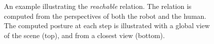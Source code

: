 \documentclass[preprint,5p]{elsarticle}
\begin{document}
\begin{figure}[!t]
	\centering
	\caption{An example illustrating the \textit{reachable} relation. The relation is computed from the perspectives of both the robot and the human. The computed posture at each step is illustrated with a global view of the scene (top), and from a closest view (bottom).}
\label{fig::reach-ex}
\end{figure}
\end{document}
